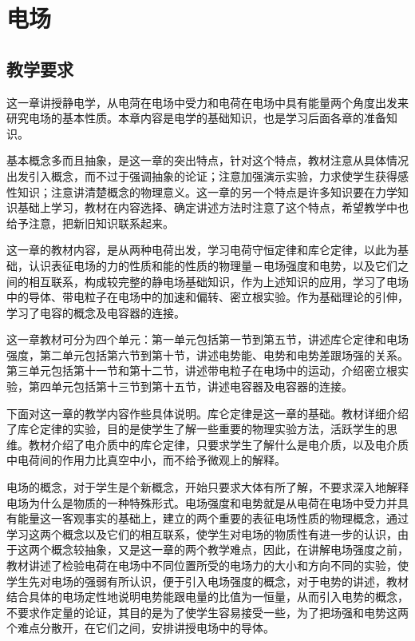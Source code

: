 \chapter{电场}
\section{教学要求}
这一章讲授静电学，从电菏在电场中受力和电荷在电场中具有能量两个角度出发来研究电场的基本性质。本章内容是电学的基础知识，也是学习后面各章的准备知识。

基本概念多而且抽象，是这一章的突出特点，针对这个特点，教材注意从具体情况出发引入概念，而不过于强调抽象的论证；注意加强演示实验，力求使学生获得感性知识；注意讲清楚概念的物理意义。这一章的另一个特点是许多知识要在力学知识基础上学习，教材在内容选择、确定讲述方法时注意了这个特点，希望教学中也给予注意，把新旧知识联系起来。

这一章的教材内容，是从两种电荷出发，学习电荷守恒定律和库仑定律，以此为基础，认识表征电场的力的性质和能的性质的物理量－电场强度和电势，以及它们之间的相互联系，构成较完整的静电场基础知识，作为上述知识的应用，学习了电场中的导体、带电粒子在电场中的加速和偏转、密立根实验。作为基础理论的引伸，学习了电容的概念及电容器的连接。

这一章教材可分为四个单元：第一单元包括第一节到第五节，讲述库仑定律和电场强度，第二单元包括第六节到第十节，讲述电势能、电势和电势差跟场强的关系。第三单元包括第十一节和第十二节，讲述带电粒子在电场中的运动，介绍密立根实验，第四单元包括第十三节到第十五节，讲述电容器及电容器的连接。

下面对这一章的教学内容作些具体说明。库仑定律是这一章的基础。教材详细介绍了库仑定律的实验，目的是使学生了解一些重要的物理实验方法，活跃学生的思维。教材介绍了电介质中的库仑定律，只要求学生了解什么是电介质，以及电介质中电荷间的作用力比真空中小，而不给予微观上的解释。

电场的概念，对于学生是个新概念，开始只要求大体有所了解，不要求深入地解释电场为什么是物质的一种特殊形式。电场强度和电势就是从电荷在电场中受力并具有能量这一客观事实的基础上，建立的两个重要的表征电场性质的物理概念，通过学习这两个概念以及它们的相互联系，使学生对电场的物质性有进一步的认识，由于这两个概念较抽象，又是这一章的两个教学难点，因此，在讲解电场强度之前，教材讲述了检验电荷在电场中不同位置所受的电场力的大小和方向不同的实验，使学生先对电场的强弱有所认识，便于引入电场强度的概念，对于电势的讲述，教材结合具体的电场定性地说明电势能跟电量的比值为一恒量，从而引入电势的概念，不要求作定量的论证，其目的是为了使学生容易接受一些，为了把场强和电势这两个难点分散开，在它们之间，安排讲授电场中的导体。

